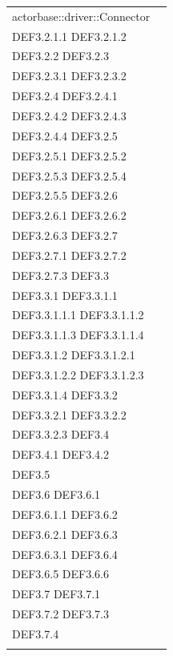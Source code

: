 \documentclass{scalatekids-article}
\begin{document}
\begin{longtable}[H]{|p{12cm}|p{5.5cm}|}
  actorbase::driver::Connector & \multiLineCell[t]{DEF3.2 DEF3.2.1\\DEF3.2.1.1 DEF3.2.1.2\\DEF3.2.2 DEF3.2.3\\DEF3.2.3.1 DEF3.2.3.2\\DEF3.2.4 DEF3.2.4.1\\DEF3.2.4.2 DEF3.2.4.3\\DEF3.2.4.4 DEF3.2.5\\DEF3.2.5.1 DEF3.2.5.2\\DEF3.2.5.3 DEF3.2.5.4\\DEF3.2.5.5 DEF3.2.6\\DEF3.2.6.1 DEF3.2.6.2\\DEF3.2.6.3 DEF3.2.7\\DEF3.2.7.1 DEF3.2.7.2\\DEF3.2.7.3 DEF3.3\\DEF3.3.1 DEF3.3.1.1\\DEF3.3.1.1.1 DEF3.3.1.1.2\\DEF3.3.1.1.3 DEF3.3.1.1.4\\DEF3.3.1.2 DEF3.3.1.2.1\\DEF3.3.1.2.2 DEF3.3.1.2.3\\DEF3.3.1.4 DEF3.3.2\\DEF3.3.2.1 DEF3.3.2.2\\DEF3.3.2.3 DEF3.4\\DEF3.4.1 DEF3.4.2\\DEF3.5\\DEF3.6 DEF3.6.1\\DEF3.6.1.1 DEF3.6.2\\DEF3.6.2.1 DEF3.6.3\\DEF3.6.3.1 DEF3.6.4\\DEF3.6.5 DEF3.6.6\\DEF3.7 DEF3.7.1\\DEF3.7.2 DEF3.7.3\\DEF3.7.4\\}\\
  \hline

\end{longtable}
\end{document}
